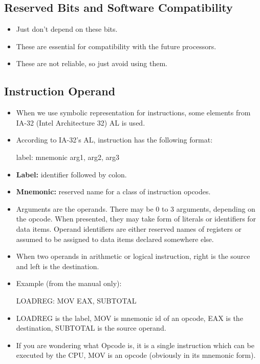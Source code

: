 \documentclass{article}
\begin{document}
\subsection{Reserved Bits and Software Compatibility}
\begin{itemize}
    \item Just don't depend on these bits. 
    \item These are essential for compatibility with the future processors. 
    \item These are not reliable, so just avoid using them.
\end{itemize}

\subsection{Instruction Operand}
\begin{itemize}
    \item When we use symbolic representation for instructions, some elements from IA-32 (Intel Architecture 32) AL is used. 
    \item According to IA-32's AL, instruction has the following format: 
    \begin{center}
        label: mnemonic arg1, arg2, arg3
    \end{center}
    \item \textbf{Label: }identifier followed by colon.
    \item \textbf{Mnemonic: }reserved name for a class of instruction opcodes. 
    \item Arguments are the operands. There may be 0 to 3 arguments, depending on the opcode. When presented, they may take form of literals or identifiers for data items. Operand identifiers are either reserved names of registers or assumed to be assigned to data items declared somewhere else. 

    \item When two operands in arithmetic or logical instruction, right is the source and left is the destination. 

    \item Example (from the manual only): 
    \begin{center}
        LOADREG: MOV EAX, SUBTOTAL
    \end{center}
    \item LOADREG is the label, MOV is mnemonic id of an opcode, EAX is the destination, SUBTOTAL is the source operand. 

    \item If you are wondering what Opcode is, it is a single instruction which can be executed by the CPU, MOV is an opcode (obviously in its mnemonic form). 
\end{itemize}
\end{document}
